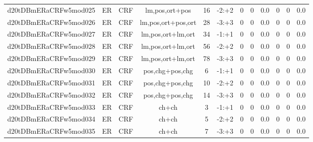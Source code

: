 \documentclass[a4paper]{article}
\begin{document}
\begin{landscape}
\begin{center}
\begin{tabular}{ |c|c|c|c|c|c|c|c|c|c|c|c|}
 
 	
 	\small{ d20tDBmERaCRFw5mod025 } & ER & CRF & lm,pos,ort+pos  &  16 &  -2:+2  &  0 & 0 & 0.0  &  0 & 0 & 0.0 \\
 	

 
 	
 	\small{ d20tDBmERaCRFw5mod026 } & ER & CRF & lm,pos,ort+pos,ort  &  28 &  -3:+3  &  0 & 0 & 0.0  &  0 & 0 & 0.0 \\
 	

 
 	
 	\small{ d20tDBmERaCRFw5mod027 } & ER & CRF & lm,pos,ort+lm,ort  &  34 &  -1:+1  &  0 & 0 & 0.0  &  0 & 0 & 0.0 \\
 	

 
 	
 	\small{ d20tDBmERaCRFw5mod028 } & ER & CRF & lm,pos,ort+lm,ort  &  56 &  -2:+2  &  0 & 0 & 0.0  &  0 & 0 & 0.0 \\
 	

 
 	
 	\small{ d20tDBmERaCRFw5mod029 } & ER & CRF & lm,pos,ort+lm,ort  &  78 &  -3:+3  &  0 & 0 & 0.0  &  0 & 0 & 0.0 \\
 	

 
 	
 	\small{ d20tDBmERaCRFw5mod030 } & ER & CRF & pos,chg+pos,chg  &  6 &  -1:+1  &  0 & 0 & 0.0  &  0 & 0 & 0.0 \\
 	

 
 	
 	\small{ d20tDBmERaCRFw5mod031 } & ER & CRF & pos,chg+pos,chg  &  10 &  -2:+2  &  0 & 0 & 0.0  &  0 & 0 & 0.0 \\
 	

 
 	
 	\small{ d20tDBmERaCRFw5mod032 } & ER & CRF & pos,chg+pos,chg  &  14 &  -3:+3  &  0 & 0 & 0.0  &  0 & 0 & 0.0 \\
 	

 
 	
 	\small{ d20tDBmERaCRFw5mod033 } & ER & CRF & ch+ch  &  3 &  -1:+1  &  0 & 0 & 0.0  &  0 & 0 & 0.0 \\
 	

 
 	
 	\small{ d20tDBmERaCRFw5mod034 } & ER & CRF & ch+ch  &  5 &  -2:+2  &  0 & 0 & 0.0  &  0 & 0 & 0.0 \\
 	

 
 	
 	\small{ d20tDBmERaCRFw5mod035 } & ER & CRF & ch+ch  &  7 &  -3:+3  &  0 & 0 & 0.0  &  0 & 0 & 0.0 \\
 	


\end{tabular}
\end{center}
\end{landscape}
\end{document}
